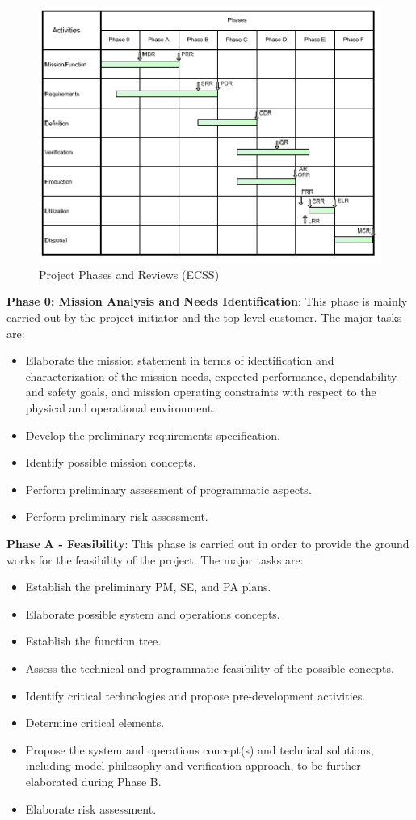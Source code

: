 \begin{figure}[h]
\centering\includegraphics[scale=1.0]{fig/project_phases_and_reviews}
\caption{Project Phases and Reviews (ECSS)}
\label{fig:Project Phases and Reviews}
\end{figure}

\textbf{Phase 0: Mission Analysis and Needs Identification}: This phase is mainly carried out by the project initiator and the top level customer. The major tasks are:
\begin{itemize}
\item Elaborate the mission statement in terms of identification and characterization of the mission needs, expected performance, dependability and safety goals, and mission operating constraints with respect to the physical and operational environment.
\item Develop the preliminary requirements specification.
\item Identify possible mission concepts.
\item Perform preliminary assessment of programmatic aspects.
\item Perform preliminary risk assessment.
\end{itemize}

\textbf{Phase A - Feasibility}: This phase is carried out in order to provide the ground works for the feasibility of the project. The major tasks are:
\begin{itemize}
\item Establish the preliminary PM, SE, and PA plans.
\item Elaborate possible system and operations concepts.
\item Establish the function tree.
\item Assess the technical and programmatic feasibility of the possible concepts.
\item Identify critical technologies and propose pre-development activities.
\item Determine critical elements.
\item Propose the system and operations concept(s) and technical solutions, including model philosophy and verification approach, to be further elaborated during Phase B.
\item Elaborate risk assessment.
\end{itemize}

